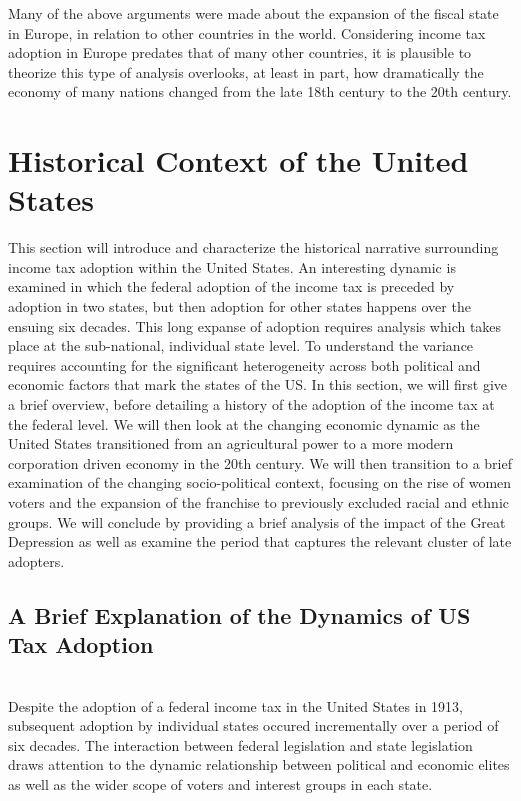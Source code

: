 \documentclass[letter, 12pt]{article}
\begin{document}
Many of the above arguments were made about the expansion of the fiscal state in Europe, in relation to other countries in the world. Considering income tax adoption in Europe predates that of many other countries, it is plausible to theorize this type of analysis overlooks, at least in part, how dramatically the economy of many nations changed from the late 18th century to the 20th century. 

\section{Historical Context of the United States}

This section will introduce and characterize the historical narrative surrounding income tax adoption within the United States. An interesting dynamic is examined in which the federal adoption of the income tax is preceded by adoption in two states, but then adoption for other states happens over the ensuing six decades. This long expanse of adoption requires analysis which takes place at the sub-national, individual state level. To understand the variance requires accounting for the significant heterogeneity across both political and economic factors that mark the states of the US. In this section, we will first give a brief overview, before detailing a history of the adoption of the income tax at the federal level. We will then look at the changing economic dynamic as the United States transitioned from an agricultural power to a more modern corporation driven economy in the 20th century. We will then transition to a brief examination of the changing socio-political context, focusing on the rise of women voters and the expansion of the franchise to previously excluded racial and ethnic groups. We will conclude by providing a brief analysis of the impact of the Great Depression as well as examine the period that captures the relevant cluster of late adopters.

\subsection{A Brief Explanation of the Dynamics of US Tax Adoption}\hfill\\
Despite the adoption of a federal income tax in the United States in 1913, subsequent adoption by individual states occured incrementally over a period of six decades. The interaction between federal legislation and state legislation draws attention to the dynamic relationship between political and economic elites as well as the wider scope of voters and interest groups in each state. 
\end{document}
